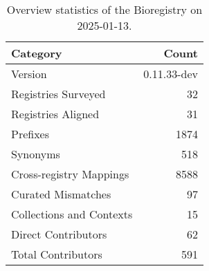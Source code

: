 \begin{table}
\caption{Overview statistics of the Bioregistry on 2025-01-13.}
\label{tab:bioregistry-summary}
\begin{tabular}{lr}
\toprule
Category & Count \\
\midrule
Version & 0.11.33-dev \\
Registries Surveyed & 32 \\
Registries Aligned & 31 \\
Prefixes & 1874 \\
Synonyms & 518 \\
Cross-registry Mappings & 8588 \\
Curated Mismatches & 97 \\
Collections and Contexts & 15 \\
Direct Contributors & 62 \\
Total Contributors & 591 \\
\bottomrule
\end{tabular}
\end{table}
